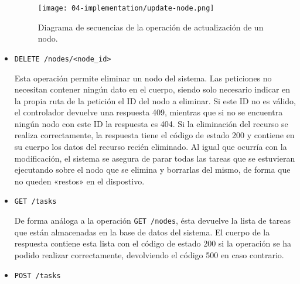 \begin{itemize}
          \begin{figure}
              \centering
              \texttt{[image: 04-implementation/update-node.png]}
              \caption{Diagrama de secuencias de la operación de actualización de un nodo.}
              \label{fig:04-update_node}
          \end{figure}

    \item \texttt{DELETE /nodes/<node\_id>}

          Esta operación permite eliminar un nodo del sistema. Las peticiones no
          necesitan contener ningún dato en el cuerpo, siendo solo necesario
          indicar en la propia ruta de la petición el ID del nodo a eliminar. Si
          este ID no es válido, el controlador devuelve una respuesta 409,
          mientras que si no se encuentra ningún nodo con este ID la respuesta
          es 404. Si la eliminación del recurso se realiza correctamente, la
          respuesta tiene el código de estado 200 y contiene en su cuerpo los
          datos del recurso recién eliminado. Al igual que ocurría con la
          modificación, el sistema se asegura de parar todas las tareas que se
          estuvieran ejecutando sobre el nodo que se elimina y borrarlas del
          mismo, de forma que no queden «restos» en el dispostivo.

    \item \texttt{GET /tasks}

          De forma análoga a la operación \texttt{GET /nodes}, ésta devuelve la
          lista de tareas que están almacenadas en la base de datos del sistema.
          El cuerpo de la respuesta contiene esta lista con el código de estado
          200 si la operación se ha podido realizar correctamente, devolviendo
          el código 500 en caso contrario.

    \item \texttt{POST /tasks}


\end{itemize}
